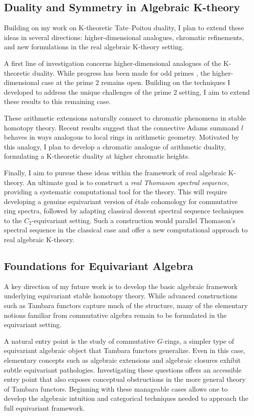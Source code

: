 \documentclass[11pt]{article}
\begin{document}
\subsection*{Duality and Symmetry in Algebraic K-theory}
Building on my work on K-theoretic Tate–Poitou duality, I plan to extend these ideas in several directions: higher-dimensional analogues, chromatic refinements, and new formulations in the real algebraic K-theory setting.

A first line of investigation concerns higher-dimensional analogues of the K-theoretic duality.
While progress has been made for odd primes \cite{Braunling}, the higher-dimensional case at the prime 2 remains open.
Building on the techniques I developed to address the unique challenges of the prime 2 setting, I aim to extend these results to this remaining case.

These arithmetic extensions naturally connect to chromatic phenomena in stable homotopy theory.
Recent results \cite{HRW} suggest that the connective Adams summand $l$ behaves in ways analogous to local rings in arithmetic geometry.
Motivated by this analogy, I plan to develop a chromatic analogue of arithmetic duality, formulating a K-theoretic duality at higher chromatic heights.

Finally, I aim to pursue these ideas within the framework of real algebraic K-theory.
An ultimate goal is to construct a {\it real Thomason spectral sequence}, providing a systematic computational tool for the theory.
This will require developing a genuine equivariant version of \'etale cohomology for commutative ring spectra, followed by adapting classical descent spectral sequence techniques to the $C_2$-equivariant setting.
Such a construction would parallel Thomason’s spectral sequence in the classical case and offer a new computational approach to real algebraic K-theory.


\subsection*{Foundations for Equivariant Algebra}
A key direction of my future work is to develop the basic algebraic framework underlying equivariant stable homotopy theory.
While advanced constructions such as Tambara functors capture much of the structure, many of the elementary notions familiar from commutative algebra remain to be formulated in the equivariant setting.

A natural entry point is the study of commutative $G$-rings, a simpler type of equivariant algebraic object that Tambara functors generalize.
Even in this case, elementary concepts such as algebraic extensions and algebraic closures exhibit subtle equivariant pathologies.
Investigating these questions offers an accessible entry point that also exposes conceptual obstructions in the more general theory of Tambara functors.
Beginning with these manageable cases allows one to develop the algebraic intuition and categorical techniques needed to approach the full equivariant framework.
\end{document}

